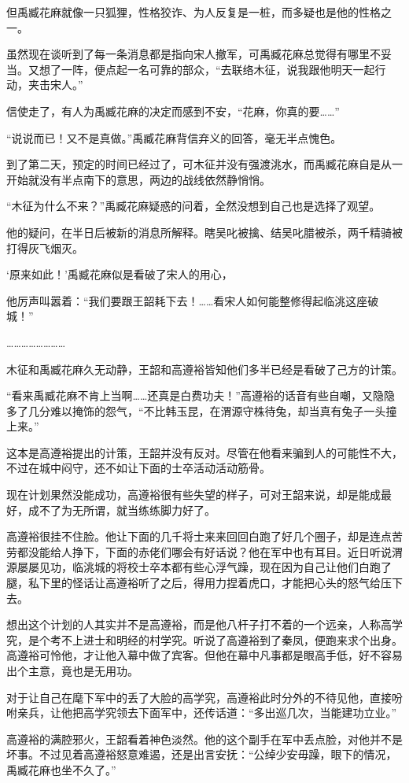 但禹臧花麻就像一只狐狸，性格狡诈、为人反复是一桩，而多疑也是他的性格之一。

虽然现在谈听到了每一条消息都是指向宋人撤军，可禹臧花麻总觉得有哪里不妥当。又想了一阵，便点起一名可靠的部众，“去联络木征，说我跟他明天一起行动，夹击宋人。”

信使走了，有人为禹臧花麻的决定而感到不安，“花麻，你真的要……”

“说说而已！又不是真做。”禹臧花麻背信弃义的回答，毫无半点愧色。

到了第二天，预定的时间已经过了，可木征并没有强渡洮水，而禹臧花麻自是从一开始就没有半点南下的意思，两边的战线依然静悄悄。

“木征为什么不来？”禹臧花麻疑惑的问着，全然没想到自己也是选择了观望。

他的疑问，在半日后被新的消息所解释。瞎吴叱被擒、结吴叱腊被杀，两千精骑被打得灰飞烟灭。

‘原来如此！’禹臧花麻似是看破了宋人的用心，

他厉声叫嚣着：“我们要跟王韶耗下去！……看宋人如何能整修得起临洮这座破城！”

……………………

木征和禹臧花麻久无动静，王韶和高遵裕皆知他们多半已经是看破了己方的计策。

“看来禹臧花麻不肯上当啊……还真是白费功夫！”高遵裕的话音有些自嘲，又隐隐多了几分难以掩饰的怨气，“不比韩玉昆，在渭源守株待兔，却当真有兔子一头撞上来。”

这本是高遵裕提出的计策，王韶并没有反对。尽管在他看来骗到人的可能性不大，不过在城中闷守，还不如让下面的士卒活动活动筋骨。

现在计划果然没能成功，高遵裕很有些失望的样子，可对王韶来说，却是能成最好，成不了为无所谓，就当练练脚力好了。

高遵裕很挂不住脸。他让下面的几千将士来来回回白跑了好几个圈子，却是连点苦劳都没能给人挣下，下面的赤佬们哪会有好话说？他在军中也有耳目。近日听说渭源屡屡见功，临洮城的将校士卒本都有些心浮气躁，现在因为自己让他们白跑了腿，私下里的怪话让高遵裕听了之后，得用力捏着虎口，才能把心头的怒气给压下去。

想出这个计划的人其实并不是高遵裕，而是他八杆子打不着的一个远亲，人称高学究，是个考不上进士和明经的村学究。听说了高遵裕到了秦凤，便跑来求个出身。高遵裕可怜他，才让他入幕中做了宾客。但他在幕中凡事都是眼高手低，好不容易出个主意，竟也是无用功。

对于让自己在麾下军中的丢了大脸的高学究，高遵裕此时分外的不待见他，直接吩咐亲兵，让他把高学究领去下面军中，还传话道：“多出巡几次，当能建功立业。”

高遵裕的满腔邪火，王韶看着神色淡然。他的这个副手在军中丢点脸，对他并不是坏事。不过见着高遵裕怒意难遏，还是出言安抚：“公绰少安毋躁，眼下的情况，禹臧花麻也坐不久了。”

